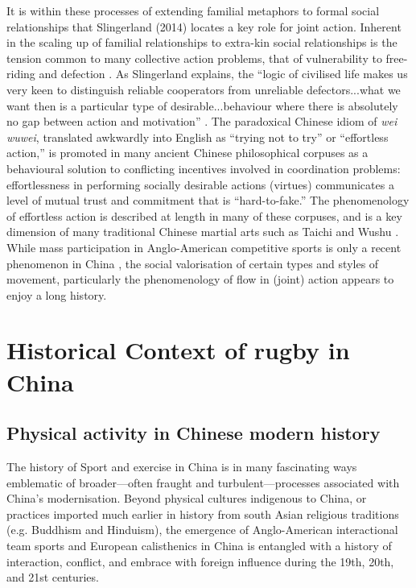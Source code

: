 {  It is within these processes of extending familial metaphors to formal social relationships that Slingerland (2014) locates a key role for joint action. Inherent in the scaling up of familial relationships to extra-kin social relationships is the tension common to many collective action problems, that of vulnerability to free-riding and defection \citep{Cosmides2013,Gavrilets2015}.
  As Slingerland explains, the ``logic of civilised life makes us very keen to distinguish reliable cooperators from unreliable defectors...what we want then is a particular type of desirable...behaviour where there is absolutely no gap between action and motivation'' \citep[192]{Slingerland2014}. The paradoxical Chinese idiom of \textit{wei wuwei}, translated awkwardly into English as ``trying not to try'' or ``effortless action,'' is promoted in many ancient Chinese philosophical corpuses as a behavioural solution to conflicting incentives involved in coordination problems: effortlessness in performing socially desirable actions (virtues) communicates a level of mutual trust and commitment that is ``hard-to-fake.''  The phenomenology of effortless action is described at length in many of these corpuses, and is a key dimension of many traditional Chinese martial arts such as Taichi and Wushu \citep{Morris1998}.
  While mass participation in Anglo-American competitive sports is only a recent phenomenon in China \citep{Brownell2008}, the social valorisation of certain types and styles of movement, particularly the phenomenology of flow in (joint) action appears to enjoy a long history.




\section{Historical Context of rugby in China}

\subsection{Physical activity in Chinese modern history}
The history of Sport and exercise in China is in many fascinating ways emblematic of broader---often fraught and turbulent---processes associated with China's modernisation.  Beyond physical cultures indigenous to China, or practices imported much earlier in history from south Asian religious traditions (e.g. Buddhism and Hinduism), the emergence of Anglo-American interactional team sports and European calisthenics in China is entangled with a history of interaction, conflict, and embrace with foreign influence during the 19th, 20th, and 21st centuries.

}
